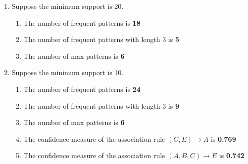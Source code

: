 \documentclass[11pt]{article}
\begin{document}
\begin{enumerate}[label=\alph*.]

\item Suppose the minimum support is 20.

\begin{enumerate}

\item The number of frequent patterns is \textbf{18}

\item The number of frequent patterns with length 3 is \textbf{5}

\item The number of max patterns is \textbf{6}

\end{enumerate}

\item Suppose the minimum support is 10.

\begin{enumerate}

\item The number of frequent patterns is \textbf{24}

\item The number of frequent patterns with length 3 is \textbf{9}

\item The number of max patterns is \textbf{6}

\item The confidence measure of the association rule $(C, E) \rightarrow A$ is \textbf{0.769}

\item The confidence measure of the association rule $(A, B, C) \rightarrow E$ is \textbf{0.742}

\end{enumerate}

\end{enumerate}
\end{document}
